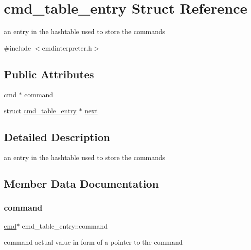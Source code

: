 \hypertarget{structcmd__table__entry}{}\section{cmd\+\_\+table\+\_\+entry Struct Reference}
\label{structcmd__table__entry}


an entry in the hashtable used to store the commands  




{\ttfamily \#include $<$cmdinterpreter.\+h$>$}

\subsection*{Public Attributes}
\begin{DoxyCompactItemize}
\item 
\mbox{\hyperlink{structcmd}{cmd}} $\ast$ \mbox{\hyperlink{structcmd__table__entry_a043725712a48894c0f3a46c7c8d51f5c}{command}}
\item 
struct \mbox{\hyperlink{structcmd__table__entry}{cmd\+\_\+table\+\_\+entry}} $\ast$ \mbox{\hyperlink{structcmd__table__entry_a851c9a91d408c30bc64b145d95a998ef}{next}}
\end{DoxyCompactItemize}


\subsection{Detailed Description}
an entry in the hashtable used to store the commands 

\subsection{Member Data Documentation}
\mbox{\label{structcmd__table__entry_a043725712a48894c0f3a46c7c8d51f5c}} 
\subsubsection{\texorpdfstring{command}{command}}
{\footnotesize\ttfamily \mbox{\hyperlink{structcmd}{cmd}}$\ast$ cmd\+\_\+table\+\_\+entry\+::command}

command actual value in form of a pointer to the command \mbox{\label{structcmd__table__entry_a851c9a91d408c30bc64b145d95a998ef}} 
